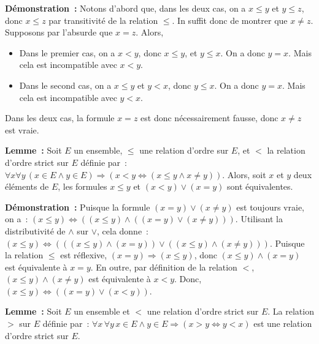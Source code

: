 \noindent\textbf{Démonstration :} Notons d'abord que, dans les deux cas, on a $x \leq y$ et $y \leq z$, donc $x \leq z$ par transitivité de la relation $\leq$. 
    In suffit donc de montrer que $x \neq z$. 
    Supposons par l'absurde que $x = z$. 
    Alors,  
    \begin{itemize}[nosep]
        \item Dans le premier cas, on a $x < y$, donc $x \leq y$, et $y \leq x$. 
            On a donc $y = x$.
            Mais cela est incompatible avec $x < y$.
        \item Dans le second cas, on a $x \leq y$ et $y < x$, donc $y \leq x$.
            On a donc $y = x$.
            Mais cela est incompatible avec $y < x$.
    \end{itemize}
    Dans les deux cas, la formule $x = z$ est donc nécessairement fausse, donc $x \neq z$ est vraie.

   \done 

\medskip

\noindent\textbf{Lemme :} Soit $E$ un ensemble, $\leq$ une relation d'ordre sur $E$, et $<$ la relation d'ordre strict sur $E$ définie par : $\forall x \forall y \, (x \in E \wedge y \in E) \Rightarrow (x < y \Leftrightarrow (x \leq y \wedge x \neq y))$.
Alors, soit $x$ et $y$ deux éléments de $E$, les formules $x \leq y$ et $(x < y) \vee (x = y)$ sont équivalentes.

\medskip

\noindent\textbf{Démonstration :} 
    Puisque la formule $(x = y) \vee (x \neq y)$ est toujours vraie, on a : $(x \leq y) \Leftrightarrow ((x \leq y) \wedge ((x = y) \vee (x \neq y)))$. 
    Utilisant la distributivité de $\wedge$ sur $\vee$, cela donne : $(x \leq y) \Leftrightarrow (((x \leq y) \wedge (x = y)) \vee ((x \leq y) \wedge (x \neq y)))$.
    Puisque la relation $\leq$ est réflexive, $(x = y) \Rightarrow (x \leq y)$, donc $(x \leq y) \wedge (x = y)$ est équivalente à $x = y$.
    En outre, par définition de la relation $<$, $(x \leq y) \wedge (x \neq y)$ est équivalente à $x < y$. 
    Donc, $(x \leq y) \Leftrightarrow ((x = y) \vee (x < y))$.

   \done 

\medskip

\noindent\textbf{Lemme :} Soit $E$ un ensemble et $<$ une relation d'ordre strict sur $E$. 
    La relation $>$ sur $E$ définie par : $\forall x \, \forall y \, x \in E \wedge y \in E \Rightarrow (x > y \Leftrightarrow y < x)$ est une relation d'ordre strict sur $E$. 

